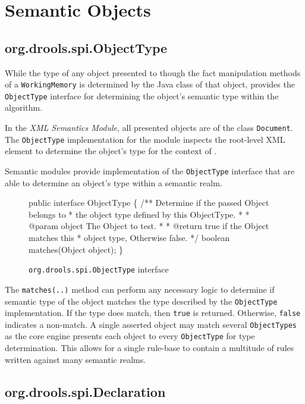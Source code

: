 \section{Semantic Objects}

\subsection{org.drools.spi.ObjectType}

While the type of any object presented to \drools{} though
the fact manipulation methods of a \verb|WorkingMemory| is determined
by the Java class of that object, \drools{} provides the
\verb|ObjectType| interface for determining the object's semantic type
within the algorithm.

In the \emph{XML Semantics Module}, all presented objects are of the
class \verb|Document|.  The \verb|ObjectType| implementation
for the module inspects the root-level XML element to determine the
object's type for the context of \drools{}.

Semantic modules provide implementation of the \verb|ObjectType|
interface that are able to determine an object's type within
a semantic realm.

\begin{figure}
\begin{codelisting}
public interface ObjectType
\{
    /** Determine if the passed Object belongs to 
     *  the object type defined by this ObjectType.
     *
     *  @param object The Object to test.
     *
     *  @return true if the Object matches this 
     *          object type, Otherwise false.
     */
    boolean matches(Object object);
\}
\end{codelisting}
\caption{\texttt{org.drools.spi.ObjectType} interface}
\label{code.ObjectType}
\end{figure}

The \verb|matches(..)| method can perform any necessary logic 
to determine if semantic type of the object matches the type described
by the \verb|ObjectType| implementation. If
the type does match, then \verb|true| is returned.  Otherwise, 
\verb|false| indicates a non-match. A single asserted object may 
match several \verb|ObjectTypes| as the core engine presents each 
object to every \verb|ObjectType| for type determination.  This
allows for a single rule-base to contain a multitude of rules 
written against many semantic realms.

\subsection{org.drools.spi.Declaration}


